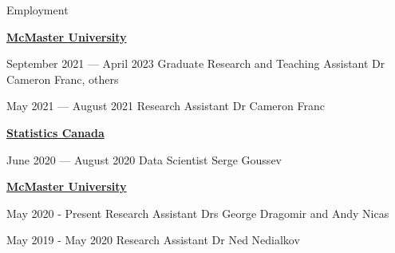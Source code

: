 \begin{rSection}{Employment}


\underline{\textbf{McMaster University}}

\begin{employNoInst}
    {September 2021 ---  April 2023}
    {Graduate Research and Teaching Assistant}
    {Dr Cameron Franc, others}    
\end{employNoInst}

\begin{employNoInst}
    {May 2021 --- August 2021}
    {Research Assistant}
    {Dr Cameron Franc}    
\end{employNoInst}


\underline{\textbf{Statistics Canada}}

\begin{employNoInst}
    {June 2020 --- August 2020}
    {Data Scientist}
    {Serge Goussev}    
\end{employNoInst}

\underline{\textbf{McMaster University}}

\begin{employNoInst}
    {May 2020 - Present}
    {Research Assistant}
    {Drs George Dragomir and Andy Nicas}    
\end{employNoInst}

\begin{employNoInst}
    {May 2019 - May 2020}
    {Research Assistant}
    {Dr Ned Nedialkov}    
\end{employNoInst}








\end{rSection}
